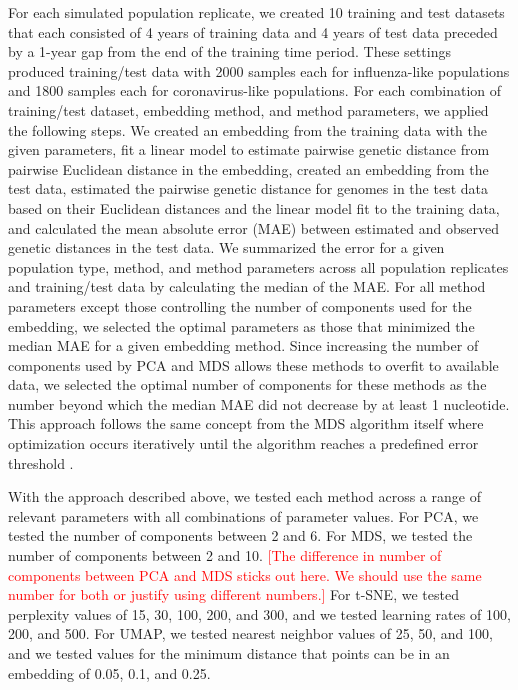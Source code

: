 \documentclass[10pt,letterpaper]{article}
\def\jhc#1{\textcolor{red}{[#1]}}
\begin{document}
For each simulated population replicate, we created 10 training and test datasets that each consisted of 4 years of training data and 4 years of test data preceded by a 1-year gap from the end of the training time period.
These settings produced training/test data with 2000 samples each for influenza-like populations and 1800 samples each for coronavirus-like populations.
For each combination of training/test dataset, embedding method, and method parameters, we applied the following steps.
We created an embedding from the training data with the given parameters, fit a linear model to estimate pairwise genetic distance from pairwise Euclidean distance in the embedding, created an embedding from the test data, estimated the pairwise genetic distance for genomes in the test data based on their Euclidean distances and the linear model fit to the training data, and calculated the mean absolute error (MAE) between estimated and observed genetic distances in the test data.
We summarized the error for a given population type, method, and method parameters across all population replicates and training/test data by calculating the median of the MAE.
For all method parameters except those controlling the number of components used for the embedding, we selected the optimal parameters as those that minimized the median MAE for a given embedding method.
Since increasing the number of components used by PCA and MDS allows these methods to overfit to available data, we selected the optimal number of components for these methods as the number beyond which the median MAE did not decrease by at least 1 nucleotide.
This approach follows the same concept from the MDS algorithm itself where optimization occurs iteratively until the algorithm reaches a predefined error threshold \cite{hout_papesh_goldinger_2012}.

With the approach described above, we tested each method across a range of relevant parameters with all combinations of parameter values.
For PCA, we tested the number of components between 2 and 6.
For MDS, we tested the number of components between 2 and 10.
\jhc{The difference in number of components between PCA and MDS sticks out here. We should use the same number for both or justify using different numbers.}
For t-SNE, we tested perplexity values of 15, 30, 100, 200, and 300, and we tested learning rates of 100, 200, and 500.
For UMAP, we tested nearest neighbor values of 25, 50, and 100, and we tested values for the minimum distance that points can be in an embedding of 0.05, 0.1, and 0.25.
\end{document}
